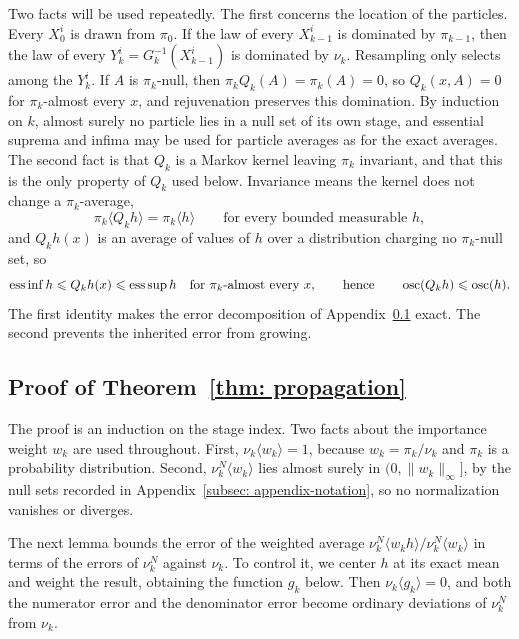 \documentclass{article}
\begin{document}
Two facts will be used repeatedly. The first concerns the location of the particles. Every $X_0^i$ is drawn from $\pi_0$. If the law of every $X_{k-1}^i$ is dominated by $\pi_{k-1}$, then the law of every $Y_k^i=G_k^{-1}(X_{k-1}^i)$ is dominated by $\nu_k$. Resampling only selects among the $Y_k^i$. If $A$ is $\pi_k$-null, then $\pi_kQ_k(A)=\pi_k(A)=0$, so $Q_k(x,A)=0$ for $\pi_k$-almost every $x$, and rejuvenation preserves this domination. By induction on $k$, almost surely no particle lies in a null set of its own stage, and essential suprema and infima may be used for particle averages as for the exact averages. The second fact is that $Q_k$ is a Markov kernel leaving $\pi_k$ invariant, and that this is the only property of $Q_k$ used below. Invariance means the kernel does not change a $\pi_k$-average,
\begin{equation}
    \pi_k\langle Q_kh\rangle = \pi_k\langle h\rangle
    \qquad\text{for every bounded measurable } h ,
    \label{eq: appendix-invariance}
\end{equation}
and $Q_kh(x)$ is an average of values of $h$ over a distribution charging no $\pi_k$-null set, so
\begin{equation}
    \operatorname{ess\,inf}h \leqslant Q_kh(x) \leqslant \operatorname{ess\,sup}h
    \quad\text{for } \pi_k\text{-almost every } x ,
    \qquad\text{hence}\qquad
    \operatorname{osc}(Q_kh) \leqslant \operatorname{osc}(h) .
    \label{eq: appendix-contraction}
\end{equation}
The first identity makes the error decomposition of Appendix~\ref{subsec: appendix-proof} exact. The second prevents the inherited error from growing.

\subsection{Proof of Theorem~\ref{thm: propagation}}
\label{subsec: appendix-proof}

The proof is an induction on the stage index. Two facts about the importance weight $w_k$ are used throughout. First, $\nu_k\langle w_k\rangle = 1$, because $w_k=\pi_k/\nu_k$ and $\pi_k$ is a probability distribution. Second, $\nu_k^N\langle w_k\rangle$ lies almost surely in $(0,\lVert w_k\rVert_\infty]$, by the null sets recorded in Appendix~\ref{subsec: appendix-notation}, so no normalization vanishes or diverges.

The next lemma bounds the error of the weighted average $\nu_k^N\langle w_kh\rangle/\nu_k^N\langle w_k\rangle$ in terms of the errors of $\nu_k^N$ against $\nu_k$. To control it, we center $h$ at its exact mean and weight the result, obtaining the function $g_k$ below. Then $\nu_k\langle g_k\rangle=0$, and both the numerator error and the denominator error become ordinary deviations of $\nu_k^N$ from $\nu_k$.
\end{document}
